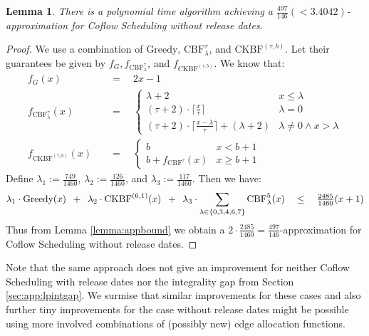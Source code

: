 \documentclass[11pt]{article}
\newcommand{\Hquad}{\hspace{0.5em}}
\newtheorem{lemma}[theorem]{Lemma}
\begin{document}
\begin{lemma}
There is a polynomial time algorithm achieving a $\frac{497}{146}(< 3.4042)$-approximation for Coflow Scheduling without release dates.
\end{lemma}
\begin{proof}
We use a combination of $\mathrm{Greedy}$, $\mathrm{CBF}^\tau_\lambda$, and $\mathrm{CKBF}^{(\tau,b)}$. Let their guarantees be given by $f_G, f_{\mathrm{CBF}^\tau_\lambda}$, and $f_{\mathrm{CKBF}^{(\tau,b)}}$. We know that:
\begin{align*}
    f_G(x) \quad&=\quad 2x-1\\
    f_{\mathrm{CBF}^\tau_\lambda}(x) \quad&=\quad \begin{cases}\lambda + 2 & x \le \lambda\\(\tau+2) \cdot \lceil \frac{x}{\tau} \rceil &  \lambda = 0\\ (\tau+2) \cdot \lceil \frac{x - \lambda}{\tau} \rceil + (\lambda + 2) & \lambda \neq 0 \wedge x > \lambda  \end{cases}\\
    f_{\mathrm{CKBF}^{(\tau,b)}}(x) \quad&=\quad \begin{cases}b & x < b+1\\b + f_{\mathrm{CBF}^\tau}(x) & x \ge b+1\end{cases}
\end{align*}
Define $\lambda_1 := \frac{749}{1460}$, $\lambda_2 := \frac{126}{1460}$, and $\lambda_3 := \frac{117}{1460}$. Then we have:
\begin{equation*}
    \lambda_1 \cdot \mathrm{Greedy}(x) \Hquad+\Hquad \lambda_2 \cdot \mathrm{CKBF}^{(6,1)}(x) \Hquad+\Hquad \lambda_3 \cdot \sum_{\lambda \in \{0,3,4,6,7\}}\mathrm{CBF}^5_\lambda(x) \quad \le \quad \tfrac{2485}{1460} (x+1)
\end{equation*}
Thus from Lemma \ref{lemma:appbound} we obtain a $2 \cdot \frac{2485}{1460} = \frac{497}{146}$-approximation for Coflow Scheduling without release dates.
\end{proof}

Note that the same approach does not give an improvement for neither Coflow Scheduling with release dates nor the integrality gap from Section \ref{sec:app:lpintgap}. We surmise that similar improvements for these cases and also further tiny improvements for the case without release dates might be possible using more involved combinations of (possibly new) edge allocation functions.
\end{document}
